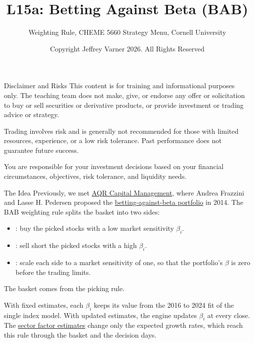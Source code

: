 \documentclass[aspectratio=169,11pt]{beamer}
\title{\texorpdfstring{{\vnheavy L15a}}{L15a}: Betting Against Beta (BAB)}
\subtitle{Weighting Rule, CHEME 5660 Strategy Menu, Cornell University}
\author{Copyright Jeffrey Varner 2026. All Rights Reserved}
\newcommand{\repo}{https://github.com/varnerlab/CHEME-5660-CourseRepository-Fall-2026/blob/main/lectures/week-15/L15a}
\begin{document}
\vntitlepage

\begin{frame}{Disclaimer and Risks}
  \vspace{0.6em}
  \textbf{} This content is for training and informational
  purposes only. The teaching team does not make, give, or endorse any offer or
  solicitation to buy or sell securities or derivative products, or provide
  investment or trading advice or strategy.

  \vspace{1.1em}
  \textbf{} Trading involves risk and is generally not recommended for
  those with limited resources, experience, or a low risk tolerance. Past
  performance does not guarantee future success.

  \vspace{1.1em}
  \textbf{} You are responsible for your investment decisions
  based on your financial circumstances, objectives, risk tolerance, and
  liquidity needs.
\end{frame}

\begin{frame}{The Idea}
  \vspace{0.3em}
  Previously, we met \href{https://www.aqr.com/Our-Firm/About-Us}{AQR Capital Management}, where
  Andrea Frazzini and Lasse H. Pedersen proposed the
  \href{https://www.aqr.com/Insights/Research/Journal-Article/Betting-Against-Beta}{betting-against-beta
  portfolio} in 2014. The BAB weighting rule splits the basket into two sides:
  \begin{itemize}\setlength{\itemsep}{0.5em}
    \item {}: buy the picked stocks with a low market sensitivity $\beta_{i}$.
    \item {}: sell short the picked stocks with a high $\beta_{i}$.
    \item {}: scale each side to a market sensitivity of one, so that the portfolio's
      $\beta$ is zero before the trading limits.
  \end{itemize}

  \vspace{0.5em}
  The basket comes from the picking rule.

  \vspace{0.5em}
  With fixed estimates, each $\beta_{i}$ keeps its value from the 2016 to 2024 fit of the single index model.
  With updated estimates, the engine updates $\beta_{i}$ at every close. The \href{\repo/strategies/slides/CHEME-5660-L15a-Strategy-Sector-Factor-Fall-2026.pdf}{sector factor estimates}
  change only the expected growth rates, which reach this rule through the basket and the decision days.
\end{frame}
\end{document}
